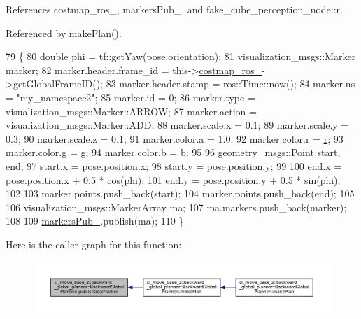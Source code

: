 References costmap\+\_\+ros\+\_\+, markers\+Pub\+\_\+, and fake\+\_\+cube\+\_\+perception\+\_\+node\+::r.



Referenced by make\+Plan().


\begin{DoxyCode}
79 \{
80     \textcolor{keywordtype}{double} phi = tf::getYaw(pose.orientation);
81     visualization\_msgs::Marker marker;
82     marker.header.frame\_id = this->\hyperlink{classcl__move__base__z_1_1backward__global__planner_1_1BackwardGlobalPlanner_a7103c15e6540a514acd421c3c6e194a4}{costmap\_ros\_}->getGlobalFrameID();
83     marker.header.stamp = ros::Time::now();
84     marker.ns = \textcolor{stringliteral}{"my\_namespace2"};
85     marker.id = 0;
86     marker.type = visualization\_msgs::Marker::ARROW;
87     marker.action = visualization\_msgs::Marker::ADD;
88     marker.scale.x = 0.1;
89     marker.scale.y = 0.3;
90     marker.scale.z = 0.1;
91     marker.color.a = 1.0;
92     marker.color.r = \hyperlink{namespacefake__cube__perception__node_a36e88703ab69fd35065e8a8d9344903e}{r};
93     marker.color.g = g;
94     marker.color.b = b;
95 
96     geometry\_msgs::Point start, end;
97     start.x = pose.position.x;
98     start.y = pose.position.y;
99 
100     end.x = pose.position.x + 0.5 * cos(phi);
101     end.y = pose.position.y + 0.5 * sin(phi);
102 
103     marker.points.push\_back(start);
104     marker.points.push\_back(end);
105 
106     visualization\_msgs::MarkerArray ma;
107     ma.markers.push\_back(marker);
108 
109     \hyperlink{classcl__move__base__z_1_1backward__global__planner_1_1BackwardGlobalPlanner_a6f80f7041c8cdc93e1f3dfd0e723654a}{markersPub\_}.publish(ma);
110 \}
\end{DoxyCode}
Here is the caller graph for this function\+:
\nopagebreak
\begin{figure}[H]
\begin{center}
\leavevmode
\includegraphics[width=350pt]{classcl__move__base__z_1_1backward__global__planner_1_1BackwardGlobalPlanner_a3c6784cad10fdadf28323380fe3d6d2b_icgraph}
\end{center}
\end{figure}



